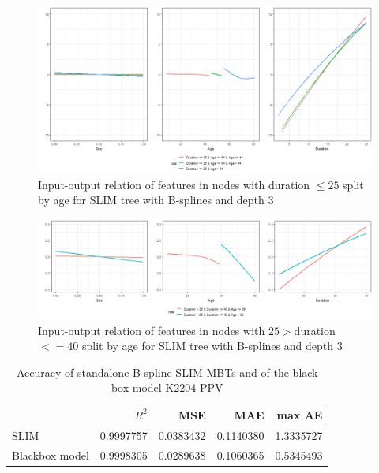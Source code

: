 \begin{figure}[!htb]
    \centering    
    \includegraphics[width = 16cm]{Figures/insurance_use_case/k2204_PPV/effects_age_low_duration.png}
    \caption{Input-output relation of features in nodes with duration $\leq 25$ split by age for SLIM tree with B-splines and depth 3}
    \label{fig:ins_k2204_ppv_effects_age_low_duration}
\end{figure}

\begin{figure}[!htb]
    \centering    
    \includegraphics[width = 16cm]{Figures/insurance_use_case/k2204_PPV/effects_age_medium_duration.png}
    \caption{Input-output relation of features in nodes with $25 > $duration $<= 40$ split by age for SLIM tree with B-splines and depth 3}
    \label{fig:ins_k2204_ppv_effects_age_medium_duration}
\end{figure}


\begin{table}[!htb]

\centering \scriptsize
\begin{tabular}[t]{l|r|r|r|r}
\hline
  & $R^2$ & MSE & MAE & max AE \\
\hline
SLIM & 0.9997757 & 0.0383432 & 0.1140380 & 1.3335727\\
Blackbox model & 0.9998305 & 0.0289638 & 0.1060365 & 0.5345493\\
\hline
\end{tabular}
\label{tab:ins_k2204_ppv_standalone_slim}
\caption{Accuracy of standalone B-spline SLIM MBTs and of the black box model K2204 PPV}
\end{table}







